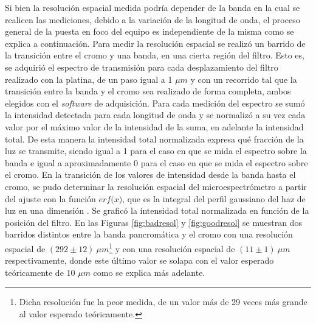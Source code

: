 Si bien la resolución espacial medida podría depender de la banda en la cual se realicen las mediciones, debido a la variación de la longitud de onda, el proceso general de la puesta en foco del equipo es independiente de la misma como se explica a continuación. Para medir la resolución espacial se realizó un barrido de la transición entre el cromo y una banda, en una cierta región del filtro. Esto es, se adquirió el espectro de transmisión para cada desplazamiento del filtro realizado con la platina, de un paso igual a 1 $\mu m$ y con un recorrido tal que la transición entre la banda y el cromo sea realizado de forma completa, ambos elegidos con el \textit{software} de adquisición. Para cada medición del espectro se sumó la intensidad detectada para cada longitud de onda y se normalizó a su vez cada valor por el máximo valor de la intensidad de la suma, en adelante la intensidad total. De esta manera la intensidad total normalizada expresa qué fracción de la luz se transmite, siendo igual a 1 para el caso en que se mida el espectro sobre la banda e igual a aproximadamente 0 para el caso en que se mida el espectro sobre el cromo. En la transición de los valores de intensidad desde la banda hasta el cromo, se pudo determinar la resolución espacial del microespectrómetro a partir del ajuste con la función $\textit{erf(x)}$, que es la integral del perfil gaussiano del haz de luz en una dimensión \cite{LASCH}. Se graficó la intensidad total normalizada en función de la posición del filtro. En las Figuras \ref{fig:badresol} y \ref{fig:goodresol} se muestran dos barridos distintos entre la banda pancromática y el cromo con una resolución espacial de $(292 \pm 12)~ \mu m$\footnote{Dicha resolución fue la peor medida, de un valor más de 29 veces más grande al valor esperado teóricamente.} y con una resolución espacial de $(11 \pm 1)~ \mu m$ respectivamente, donde este último valor se solapa con el valor esperado teóricamente de 10 $\mu m$ como se explica más adelante.


